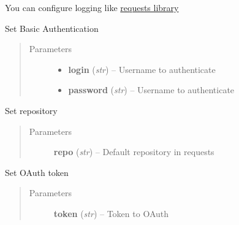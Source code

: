 \documentclass[letterpaper,10pt,english]{sphinxmanual}
\begin{document}
\begin{fulllineitems}
You can configure  logging like \href{http://docs.python-requests.org/en/v0.10.6/user/advanced/\#verbose-logging}{requests library}

\begin{fulllineitems}
\label{services:pygithub3.services.base.Service.set_credentials}
Set Basic Authentication
\begin{quote}\begin{description}
\item[{Parameters}] \leavevmode\begin{itemize}
\item {} 
\textbf{login} (\emph{str}) -- Username to authenticate

\item {} 
\textbf{password} (\emph{str}) -- Username to authenticate

\end{itemize}

\end{description}\end{quote}

\end{fulllineitems}


\begin{fulllineitems}
\label{services:pygithub3.services.base.Service.set_repo}
Set repository
\begin{quote}\begin{description}
\item[{Parameters}] \leavevmode
\textbf{repo} (\emph{str}) -- Default repository in requests

\end{description}\end{quote}

\end{fulllineitems}


\begin{fulllineitems}
\label{services:pygithub3.services.base.Service.set_token}
Set OAuth token
\begin{quote}\begin{description}
\item[{Parameters}] \leavevmode
\textbf{token} (\emph{str}) -- Token to OAuth


\end{description}
\end{quote}
\end{fulllineitems}
\end{fulllineitems}
\end{document}
